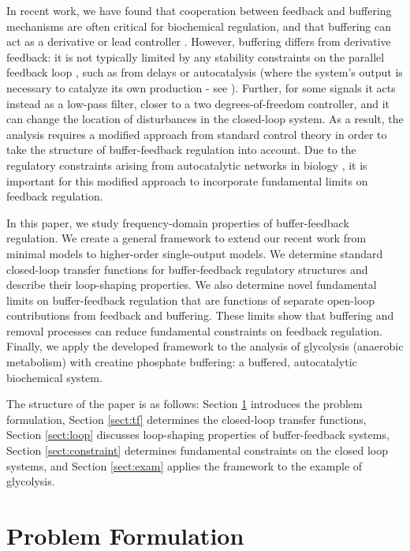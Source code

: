 \documentclass[letterpaper, 10 pt,  conference]{ieeeconf}  %
\begin{document}
In recent work, we have found that cooperation between feedback and buffering mechanisms are often critical for biochemical regulation, and that buffering can act as a derivative or lead controller \cite{HANAPS17}. However, buffering differs from derivative feedback: it is not typically limited by any stability constraints on the parallel feedback loop \cite{HANAPS17}, such as from delays or autocatalysis (where the system's output is necessary to catalyze its own production - see \cite{CHABD11,SIAEA17}). Further, for some signals it acts instead as a low-pass filter, closer to a two degrees-of-freedom controller, and it can change the location of disturbances in the closed-loop system. As a result, the analysis requires a modified approach from standard control theory in order to take the structure of buffer-feedback regulation into account. Due to the regulatory constraints arising from autocatalytic networks in biology \cite{BUZD10, CHABD11,MOTEA10, SIAEA17}, it is important for this modified approach to incorporate fundamental limits on feedback regulation. 

In this paper, we study frequency-domain properties of buffer-feedback regulation. We create a general framework to extend our recent work from minimal models \cite{HANAPS17} to higher-order single-output models. We determine standard closed-loop transfer functions for buffer-feedback regulatory structures and describe their loop-shaping properties.  We also determine novel fundamental limits on buffer-feedback regulation that are functions of separate open-loop contributions from feedback and buffering. These limits show that buffering and removal processes can reduce fundamental constraints on feedback regulation. Finally, we apply the developed framework to the analysis of glycolysis (anaerobic metabolism) with creatine phosphate buffering: a buffered, autocatalytic biochemical system. 

The structure of the paper is as follows: Section \ref{sect:pf} introduces the problem formulation, Section \ref{sect:tf} determines the closed-loop transfer functions, Section \ref{sect:loop} discusses loop-shaping properties of buffer-feedback systems, Section \ref{sect:constraint} determines fundamental constraints on the closed loop systems, and Section \ref{sect:exam} applies the framework to the example of glycolysis.

\section{Problem Formulation}\label{sect:pf}
\end{document}
